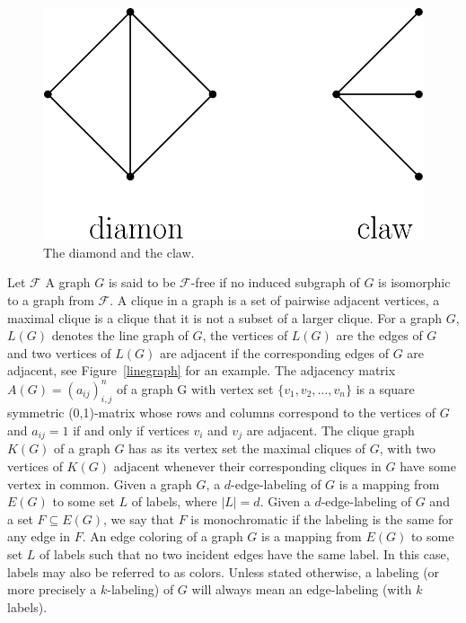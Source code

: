 \documentclass[12pt,a4paper,titlepage,openany]{report}
\begin{document}
\begin{figure}[h]
\begin{center}
\includegraphics[width=0.5\linewidth]{figures/diaclaw.png}
\end{center}
\caption{The diamond and the claw.}\label{diaclaw}
\end{figure}

Let $\mathcal{F}$ A graph $G$ is said to be $\mathcal{F}$-free if no induced subgraph of $G$ is isomorphic to a graph from $\mathcal{F}$. A clique in a graph is a set of pairwise adjacent vertices, a maximal clique is a clique that it is not a subset of a larger clique. For a graph $G$, $L(G)$ denotes the line graph of $G$, the vertices of $L(G)$ are the edges of $G$ and two vertices of $L(G)$ are adjacent if the corresponding edges of $G$ are adjacent, see Figure~\ref{linegraph} for an example. The adjacency matrix $A(G)=(a_{ij})_{i,j}^n$ of a graph G with vertex set $\{ v_1,v_2,\ldots, v_n\}$ is a square symmetric (0,1)-matrix whose rows and columns correspond to the vertices of $G$ and $a_{ij} = 1$ if and only if vertices $v_i$ and $v_j$ are adjacent. The clique graph $K(G)$ of a graph $G$ has as its vertex set the maximal cliques of $G$, with two vertices of $K(G)$ adjacent whenever their corresponding cliques in $G$ have some vertex in common.\newline
Given a graph $G$, a $d$-edge-labeling of $G$ is a mapping from $E(G)$ to some set $L$ of labels, where $|L| = d$. Given a $d$-edge-labeling of $G$ and a set $F \subseteq E(G)$,
we say that $F$ is monochromatic if the labeling is the same for any edge in $F$. An edge coloring of a graph $G$ is a mapping from $E(G)$ to some set $L$ of labels such that no two incident edges have the same label. In this case, labels may also be referred to as colors.  Unless stated otherwise, a labeling (or more precisely a $k$-labeling) of $G$ will always mean an edge-labeling (with $k$ labels).
\end{document}

